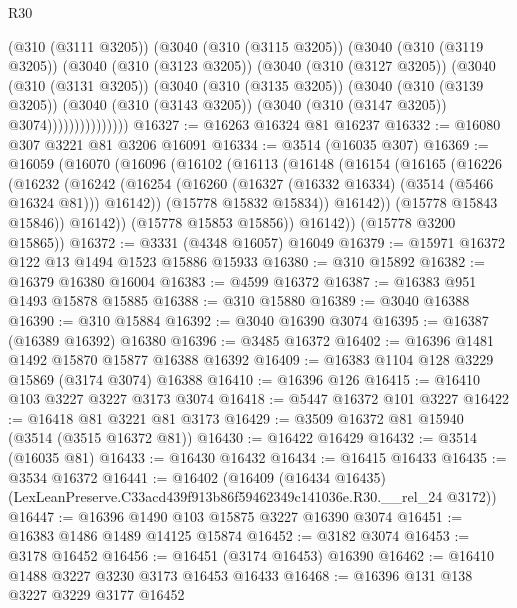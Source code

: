 \begin{lexlean}{R30}
\begin{coremodule}
                (@310 (@3111 @3205))
                (@3040
                  (@310 (@3115 @3205))
                  (@3040
                    (@310 (@3119 @3205))
                    (@3040
                      (@310 (@3123 @3205))
                      (@3040
                        (@310 (@3127 @3205))
                        (@3040
                          (@310 (@3131 @3205))
                          (@3040
                            (@310 (@3135 @3205))
                            (@3040
                              (@310 (@3139 @3205))
                              (@3040
                                (@310 (@3143 @3205))
                                (@3040 (@310 (@3147 @3205)) @3074)))))))))))))))
@16327 := @16263 @16324 @81 @16237
@16332 := @16080 @307 @3221 @81 @3206 @16091
@16334 := @3514 (@16035 @307)
@16369 := @16059
    (@16070
      (@16096
        (@16102
          (@16113
            (@16148
              (@16154
                (@16165
                  (@16226
                    (@16232
                      (@16242
                        (@16254 (@16260 (@16327 (@16332 @16334) (@3514 (@5466 @16324 @81))) @16142))
                        (@15778 @15832 @15834))
                      @16142))
                  (@15778 @15843 @15846))
                @16142))
            (@15778 @15853 @15856))
          @16142))
      (@15778 @3200 @15865))
@16372 := @3331 (@4348 @16057) @16049
@16379 := @15971 @16372 @122 @13 @1494 @1523 @15886 @15933
@16380 := @310 @15892
@16382 := @16379 @16380 @16004
@16383 := @4599 @16372
@16387 := @16383 @951 @1493 @15878 @15885
@16388 := @310 @15880
@16389 := @3040 @16388
@16390 := @310 @15884
@16392 := @3040 @16390 @3074
@16395 := @16387 (@16389 @16392) @16380
@16396 := @3485 @16372
@16402 := @16396 @1481 @1492 @15870 @15877 @16388 @16392
@16409 := @16383 @1104 @128 @3229 @15869 (@3174 @3074) @16388
@16410 := @16396 @126
@16415 := @16410 @103 @3227 @3227 @3173 @3074
@16418 := @5447 @16372 @101 @3227
@16422 := @16418 @81 @3221 @81 @3173
@16429 := @3509 @16372 @81 @15940 (@3514 (@3515 @16372 @81))
@16430 := @16422 @16429
@16432 := @3514 (@16035 @81)
@16433 := @16430 @16432
@16434 := @16415 @16433
@16435 := @3534 @16372
@16441 := @16402
    (@16409 (@16434 @16435) (LexLeanPreserve.C33acd439f913b86f59462349c141036e.R30.__rel_24 @3172))
@16447 := @16396 @1490 @103 @15875 @3227 @16390 @3074
@16451 := @16383 @1486 @1489 @14125 @15874
@16452 := @3182 @3074
@16453 := @3178 @16452
@16456 := @16451 (@3174 @16453) @16390
@16462 := @16410 @1488 @3227 @3230 @3173 @16453 @16433
@16468 := @16396 @131 @138 @3227 @3229 @3177 @16452

\end{coremodule}
\end{lexlean}
